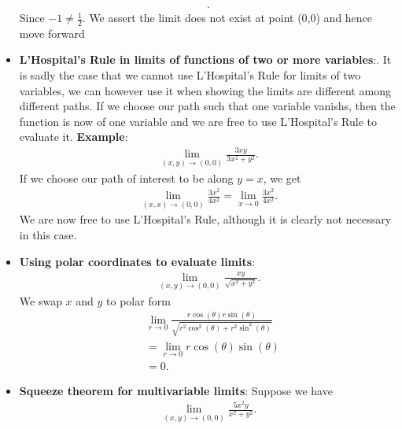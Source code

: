 \documentclass{report}
\begin{document}
\begin{itemize}
\begin{align*}
                .\end{align*}
                Since $-1 \neq \frac{1}{2}$. We assert the limit does not exist at point (0,0) and hence move forward
            \item \textbf{ L'Hospital's Rule in limits of functions of two or more variables}:. It is sadly the case that we cannot use L'Hospital's Rule for limits of two variables, we can however use it when showing the limits are different among different paths. If we choose our path such that one variable vanishs, then the function is now of one variable and we are free to use L'Hospital's Rule to evaluate it.
                \bigbreak \noindent 
                \textbf{Example}:
                \begin{align*}
                    \lim\limits_{(x,y) \to (0,0)}{\frac{3xy}{3x^{2} + y^{2}}}
                .\end{align*}
                If we choose our path of interest to be along $y=x$, we get 
                \begin{align*}
                    \lim\limits_{(x,x) \to (0,0)}{\frac{3x^{2}}{4x^{2}}} = \lim\limits_{x \to 0}{\frac{3x^{2}}{4x^{2}}}
                .\end{align*}
                We are now free to use L'Hospital's Rule, although it is clearly not necessary in this case.
            \item \textbf{Using polar coordinates to evaluate limits}:
                \begin{align*}
                    \lim\limits_{(x,y) \to (0,0)}{\frac{xy}{\sqrt{x^{2}+y^{2}}}}
                .\end{align*}
                We swap $x$ and $y$ to polar form
                \begin{align*}
                    &\lim\limits_{r \to 0}{\frac{r\cos{\left(\theta\right)}r\sin{\left(\theta\right)}}{\sqrt{r^{2}\cos^{2}{\left(\theta\right)}+r^{2}\sin^{2}{\left(\theta \right)}}}} \\
                    &=\lim\limits_{r \to 0}{r\cos{\left(\theta\right)}\sin{\left(\theta\right)}} \\
                    &=0
                .\end{align*}
            \item \textbf{Squeeze theorem for multivariable limits}: Suppose we have
                \begin{align*}
                    \lim\limits_{(x,y) \to (0,0)}{ \frac{5x^{2}y}{x^{2}+y^{2}}   }
                .\end{align*}

\end{itemize}
\end{document}
